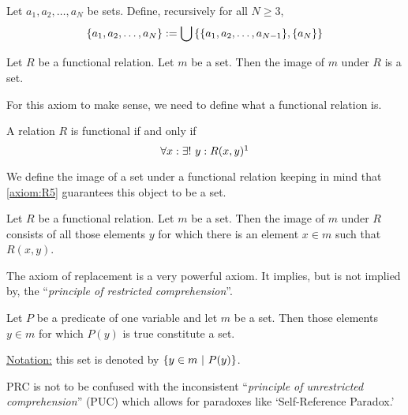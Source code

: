 \begin{definition}
	Let \(a_1, a_2, \ldots, a_N\) be sets. Define, recursively for all \(N \ge 3\),
	\begin{equation}
		\qty{a_1, a_2, \ldots, a_N} := \bigcup\qty{\qty{a_1, a_2, \ldots, a_{N-1}}, \qty{a_N}}
	\end{equation}
\end{definition}

\begin{axiom}\label{axiom:R5}
	Let \(R\) be a functional relation. Let \(m\) be a set. Then the image of \(m\) under \(R\) \normalfont{[\(\img_R(m)\)]} is a set.
\end{axiom}
For this axiom to make sense, we need to define what a functional relation is.
\begin{definition}
	A relation \(R\) is functional if and only if
	\begin{equation}
		\forall x: \exists!\ y: R(x, y)\footnotemark
	\end{equation}
\end{definition}
We define the image of a set under a functional relation keeping in mind that \cref{axiom:R5} guarantees this object to be a set.
\begin{definition}
	Let \(R\) be a functional relation. Let \(m\) be a set. Then the image of \(m\) under \(R\) consists of all those elements \(y\) for which there is an element \(x \in m\) such that \(R(x, y)\).
\end{definition}

The axiom of replacement is a very powerful axiom. It implies, but is not implied by, the ``\emph{principle of restricted comprehension}''.
\begin{theorem}\label{thm:PRC}
	Let \(P\) be a predicate of one variable and let \(m\) be a set. Then those elements \(y \in m\) for which \(P(y)\) is true constitute a set.

	\noindent\uline{Notation:} this set is denoted by \(\qty{y \in m \ \middle|\ P(y)}\).
\end{theorem}
PRC is not to be confused with the inconsistent ``\emph{principle of unrestricted comprehension}'' (PUC) which allows for paradoxes like `Self-Reference Paradox.'

